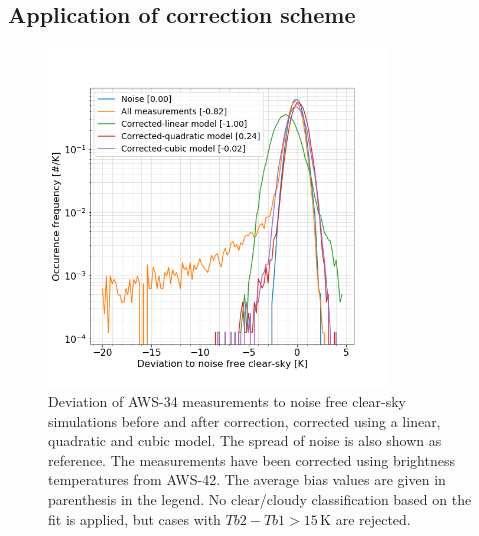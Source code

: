 \documentclass[12pt]{article}
\begin{document}


\subsection{Application of correction scheme}
\begin{figure}[!p]
	\centering
	\includegraphics[clip,trim=0 0 0 0,height=90mm]{PDF_corrected_AWS-34_AWS-42}
	\caption{Deviation of AWS-34 measurements to noise free clear-sky
      simulations before and after correction, corrected using a linear,
      quadratic and cubic model. The spread of noise is also shown as
      reference. The measurements have been corrected using brightness
      temperatures from AWS-42. The average bias values are given in parenthesis in the legend. No clear/cloudy classification based on the fit is applied, but cases with $Tb2 - Tb1 > 15$\,K are rejected.}
	\label{fig:correction:c34-42}
\end{figure}
%
\end{document}
